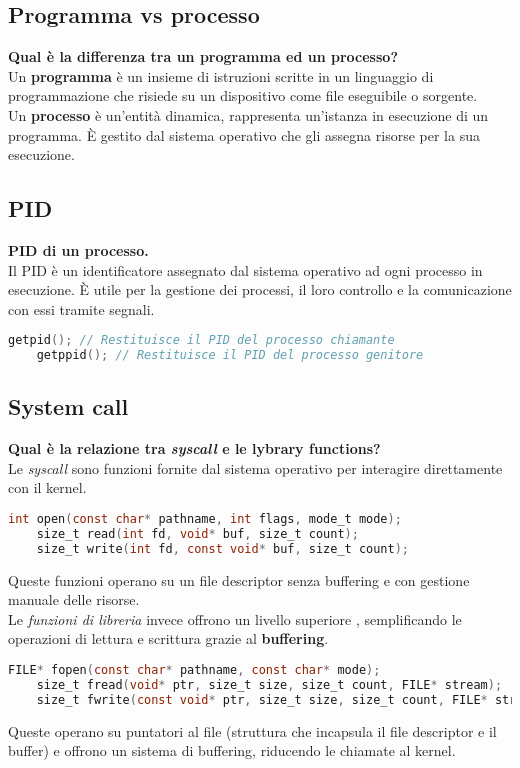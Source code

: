 \subsection{Programma vs processo}
\textbf{Qual è la differenza tra un programma ed un processo?}\\
Un \textbf{programma} è un insieme di istruzioni scritte in un linguaggio di programmazione che risiede su un dispositivo come file eseguibile o sorgente.\\
Un \textbf{processo} è un'entità dinamica, rappresenta un'istanza in esecuzione di un programma. È gestito dal sistema operativo che gli assegna risorse per la sua esecuzione.

\subsection{PID}
\textbf{PID di un processo.}\\
Il PID è un identificatore assegnato dal sistema operativo ad ogni processo in esecuzione. È utile per la gestione dei processi, il loro controllo e la comunicazione con essi tramite segnali.
\begin{lstlisting}[language=C]
	getpid(); // Restituisce il PID del processo chiamante
	getppid(); // Restituisce il PID del processo genitore
\end{lstlisting}

\subsection{System call}

\textbf{Qual è la relazione tra \textit{syscall} e le lybrary functions?}\\
Le \textit{syscall} sono funzioni fornite dal sistema operativo per interagire direttamente con il kernel.
\begin{lstlisting}[language=C]
	int open(const char* pathname, int flags, mode_t mode);
	size_t read(int fd, void* buf, size_t count);
	size_t write(int fd, const void* buf, size_t count);
\end{lstlisting}
Queste funzioni operano su un file descriptor senza buffering e con gestione manuale delle risorse.\\
Le \textit{funzioni di libreria} invece offrono un livello superiore , semplificando le operazioni di lettura e scrittura grazie al \textbf{buffering}.
\begin{lstlisting}[language=C]
	FILE* fopen(const char* pathname, const char* mode);
	size_t fread(void* ptr, size_t size, size_t count, FILE* stream);
	size_t fwrite(const void* ptr, size_t size, size_t count, FILE* stream);
\end{lstlisting}
Queste operano su puntatori al file (struttura che incapsula il file descriptor e il buffer) e offrono un sistema di buffering, riducendo le chiamate al kernel.


